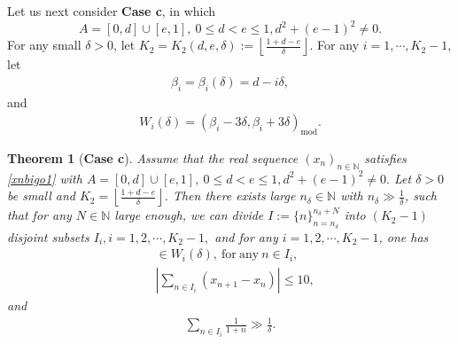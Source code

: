 \documentclass[12pt]{amsart}
\newcommand{\abs}[1]{\left\lvert #1 \right\rvert}
\theoremstyle{plain}
\newtheorem{theorem}{Theorem}[section]
\theoremstyle{definition}
\begin{document}
Let us next consider \textbf{Case c}, in which 
$$A=[0,d]\cup [e,1], \ 0\leq d<e\leq 1,d^2+(e-1)^2\neq0.$$ 
For any small $\delta>0$, let $K_2=K_2(d,e,\delta):=\left \lfloor \frac{1+d-e}{\delta} \right \rfloor$. 
For any $i=1,\cdots,K_2-1$, let
\begin{align}
	\beta_i=\beta_i(\delta)=d-i\delta,
\end{align}
and
\begin{align}
	W_i(\delta)=(\beta_i-3\delta,\beta_i+3\delta)_{\mathrm{mod}}.\label{deofWi}
\end{align}
\begin{theorem}[\textbf{Case c}]\label{casec}
	Assume that the real sequence $(x_n)_{n\in\mathbb{N}}$ satisfies \eqref{xnbigo1} with $A=[0,d]\cup [e,1], \ 0\leq d<e\leq 1,d^2+(e-1)^2\neq0.$ Let $\delta>0$ be small and $K_2=\left \lfloor \frac{1+d-e}{\delta} \right \rfloor$. Then there exists large $n_\delta\in\mathbb{N}$ with $n_\delta\gg \frac{1}{\delta}$, such that for any $N\in\mathbb{N}$ large enough, we can divide $I:=\{n\}_{n=n_\delta}^{n_\delta+N}$ into $(K_2-1)$ disjoint subsets $I_i, i=1,2,\cdots,K_2-1,$  and for any $i=1,2,\cdots,K_2-1$, one has
	\begin{align}
		[x_n]&\in W_i(\delta),\ \mathrm{for\ any}\ n\in I_i,\label{aiinwi}\\
		&\abs{\sum_{n\in I_i}(x_{n+1}-x_n)}\leq 10,\label{Iileq10cased}
	\end{align}
	and 
	\begin{align}
		\sum_{n\in I_i}\frac{1}{1+n}\gg \frac{1}{\delta}.\label{Iifractionlargecased}
	\end{align}
\end{theorem}
\end{document}
